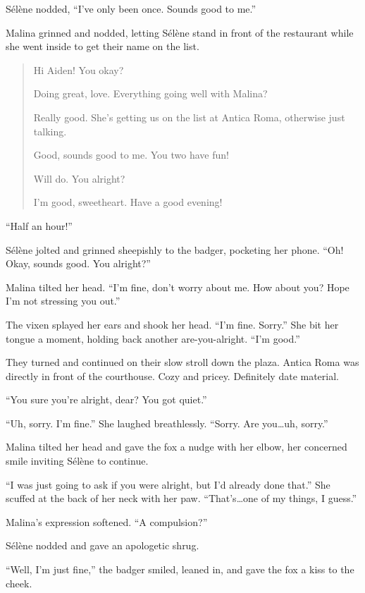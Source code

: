 Sélène nodded, ``I've only been once. Sounds good to me.''

Malina grinned and nodded, letting Sélène stand in front of the restaurant while she went inside to get their name on the list.

\begin{quote}
 Hi Aiden! You okay?

 Doing great, love. Everything going well with Malina?

 Really good. She's getting us on the list at Antica Roma, otherwise just talking.

 Good, sounds good to me. You two have fun!

 Will do. You alright?

 I'm good, sweetheart. Have a good evening!
\end{quote}

``Half an hour!''

Sélène jolted and grinned sheepishly to the badger, pocketing her phone. ``Oh! Okay, sounds good. You alright?''

Malina tilted her head. ``I'm fine, don't worry about me. How about you? Hope I'm not stressing you out.''

The vixen splayed her ears and shook her head. ``I'm fine. Sorry.'' She bit her tongue a moment, holding back another are-you-alright. ``I'm good.''

They turned and continued on their slow stroll down the plaza. Antica Roma was directly in front of the courthouse. Cozy and pricey. Definitely date material.

``You sure you're alright, dear? You got quiet.''

``Uh, sorry. I'm fine.'' She laughed breathlessly. ``Sorry. Are you\ldots{}uh, sorry.''

Malina tilted her head and gave the fox a nudge with her elbow, her concerned smile inviting Sélène to continue.

``I was just going to ask if you were alright, but I'd already done that.'' She scuffed at the back of her neck with her paw. ``That's\ldots{}one of my things, I guess.''

Malina's expression softened. ``A compulsion?''

Sélène nodded and gave an apologetic shrug.

``Well, I'm just fine,'' the badger smiled, leaned in, and gave the fox a kiss to the cheek.


